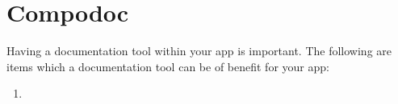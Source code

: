\maketitle{}
\section{ Compodoc }
Having a documentation tool within your app is important. The following are
items which a documentation tool can be of benefit for your app:
\begin{enumerate}
  \item 
\end{enumerate}
